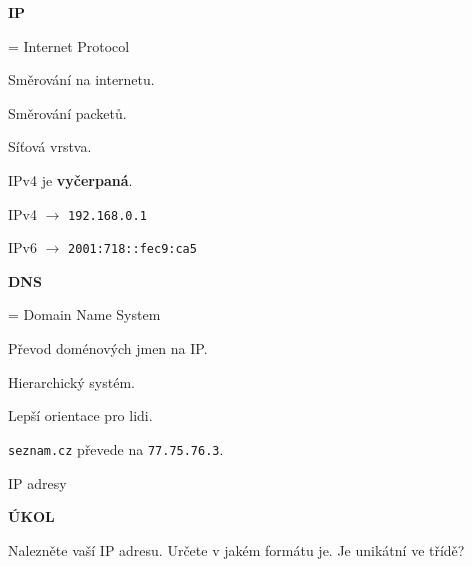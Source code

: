 \documentclass[aspectratio=169]{beamer}
\begin{document}
\begin{frame}
    \begin{multicols}{2}
        \centering
        

        \begin{cardTiny}
            \textbf{IP}
            
            \begin{flushleft}
            = Internet Protocol

            \vspace{2ex}
            Směrování na internetu.

            Směrování packetů.

            Síťová vrstva.

            \vspace{2ex}
            IPv4 je \textbf{vyčerpaná}.

            \vspace{2ex}
            IPv4 $\rightarrow$ \texttt{192.168.0.1}

            IPv6 $\rightarrow$ \texttt{2001:718::fec9:ca5}
            \end{flushleft}
        \end{cardTiny}

        \begin{cardTiny}
            \textbf{DNS}
        
            \begin{flushleft}
            = Domain Name System

            \vspace{2ex}
            Převod doménových jmen na IP.
            
            \vspace{2ex}
            Hierarchický systém.

            Lepší orientace pro lidi.

            \vspace{2ex}
            \texttt{seznam.cz} převede na \texttt{77.75.76.3}.

            \end{flushleft}
        \end{cardTiny}
    \end{multicols}
\end{frame}


\begin{frame}{IP adresy}
    \begin{cardTiny}
        \begin{center}
            \textbf{ÚKOL}
        \end{center}
        \begin{flushleft}
            Nalezněte vaší IP adresu. Určete v jakém formátu je. Je unikátní ve třídě?
        \end{flushleft}
    \end{cardTiny}
\end{frame}
\end{document}
